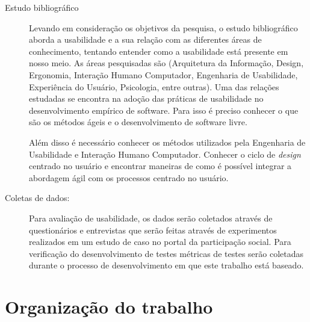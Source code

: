 \begin{description}
\item[Estudo bibliográfico]

%
Levando em consideração os objetivos da pesquisa, o estudo bibliográfico aborda a usabilidade e a sua relação com as diferentes áreas de conhecimento, tentando entender como a usabilidade está presente em nosso meio. As áreas pesquisadas são (Arquitetura da Informação, Design, Ergonomia, Interação Humano Computador, Engenharia de Usabilidade, Experiência do Usuário, Psicologia, entre outras).
%
Uma das relações estudadas se encontra na adoção das práticas de usabilidade no desenvolvimento empírico de software. Para isso é preciso conhecer o que são os métodos ágeis e o desenvolvimento de software livre.

%
Além disso é necessário conhecer os métodos utilizados pela Engenharia de Usabilidade e Interação Humano Computador. Conhecer o ciclo de \emph{design} centrado no usuário e encontrar maneiras de como é possível integrar a abordagem ágil com os processos centrado no usuário.
%



\item[Coletas de dados:]
%
Para avaliação de usabilidade, os dados serão coletados através de questionários e entrevistas que serão feitas através de experimentos realizados em um estudo de caso no portal da participação social.
Para verificação do desenvolvimento de testes métricas de testes serão coletadas durante o processo de desenvolvimento em que este trabalho está baseado.


\end{description}

\section{Organização do trabalho}

